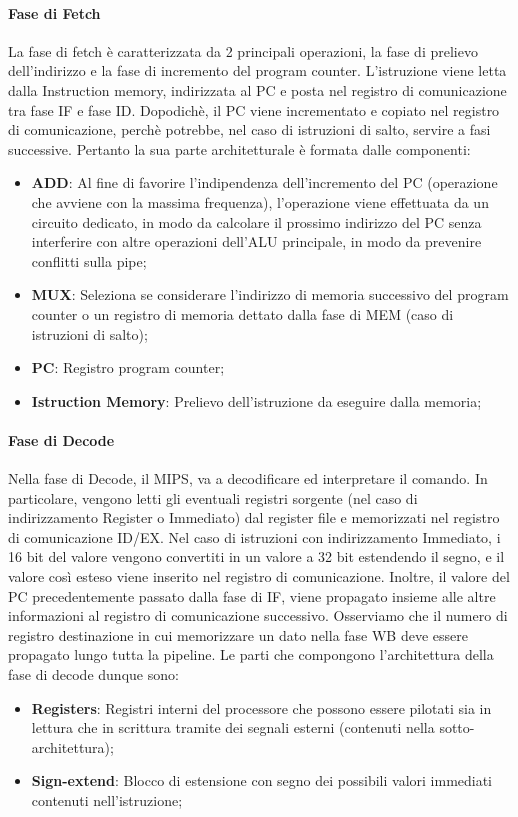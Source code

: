 \paragraph{Fase di Fetch}
La fase di fetch è caratterizzata da 2 principali operazioni, la fase di prelievo dell'indirizzo e la fase di incremento del program counter. 
L'istruzione viene letta dalla Instruction memory, indirizzata al PC e posta nel registro di comunicazione tra fase IF e fase ID. Dopodichè, il PC viene incrementato e copiato nel registro di comunicazione, perchè potrebbe, nel caso di istruzioni di salto, servire a fasi successive.
Pertanto la sua parte architetturale è formata dalle componenti:
\begin{itemize}
    \item \textbf{ADD}: Al fine di favorire l'indipendenza dell'incremento del PC (operazione che avviene con la massima frequenza), l'operazione viene effettuata da un circuito dedicato, in modo da calcolare il prossimo indirizzo del PC senza interferire con altre operazioni dell'ALU principale, in modo da prevenire conflitti sulla pipe;
    \item \textbf{MUX}: Seleziona se considerare l'indirizzo di memoria successivo del program counter o un registro di memoria dettato dalla fase di MEM (caso di istruzioni di salto);
    \item \textbf{PC}: Registro program counter;
    \item \textbf{Istruction Memory}: Prelievo dell'istruzione da eseguire dalla memoria;
\end{itemize}

\paragraph{Fase di Decode}
Nella fase di Decode, il MIPS, va a decodificare ed interpretare il comando. In particolare, vengono letti gli eventuali registri sorgente (nel caso di indirizzamento Register o Immediato) dal register file e memorizzati nel registro di comunicazione ID/EX. Nel caso di istruzioni con indirizzamento Immediato, i 16 bit del valore vengono convertiti in un valore a 32 bit estendendo il segno, e il valore così esteso viene inserito nel registro di comunicazione. Inoltre, il valore del PC precedentemente passato dalla fase di IF, viene propagato insieme alle altre informazioni al registro di comunicazione successivo. Osserviamo che il numero di registro destinazione in cui memorizzare un dato nella fase WB deve essere propagato lungo tutta la pipeline.
Le parti che compongono l'architettura della fase di decode dunque sono:
\begin{itemize}
    \item \textbf{Registers}: Registri interni del processore che possono essere pilotati sia in lettura che in scrittura tramite dei segnali esterni (contenuti nella sotto-architettura);
    \item \textbf{Sign-extend}: Blocco di estensione con segno dei possibili valori immediati contenuti nell'istruzione;
\end{itemize}

